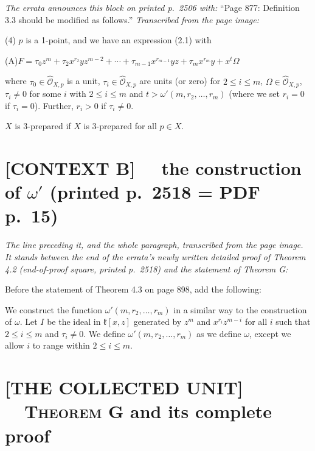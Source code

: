 \documentclass[11pt]{article}
\newcommand{\fk}{\mathfrak{k}}                 %
\newcommand{\OH}{\widehat{\mathcal{O}}}        %
\begin{document}
\emph{The errata announces this block on printed p.\ 2506 with:} ``Page 877: Definition
3.3 should be modified as follows.'' \emph{Transcribed from the page image:}

\medskip
(4) $p$ is a 1-point, and we have an expression (2.1) with

(A)\quad $F = \tau_0 z^m + \tau_2 x^{r_2} y z^{m-2} + \cdots + \tau_{m-1} x^{r_{m-1}} y z + \tau_m x^{r_m} y + x^t \Omega$

\smallskip
where $\tau_0 \in \OH_{X,p}$ is a unit, $\tau_i \in \OH_{X,p}$ are units (or zero) for
$2 \leqslant i \leqslant m$, $\Omega \in \OH_{X,p}$, $\tau_i \neq 0$ for some $i$ with
$2 \leqslant i \leqslant m$ and $t > \omega'(m, r_2, \dots, r_m)$ (where we set $r_i = 0$
if $\tau_i = 0$). Further, $r_i > 0$ if $\tau_i \neq 0$.

\medskip
$X$ is 3-prepared if $X$ is 3-prepared for all $p \in X$.

\section*{[CONTEXT B] \ \ the construction of $\omega'$ \quad (printed p.\ 2518 = PDF p.\ 15)}

\emph{The line preceding it, and the whole paragraph, transcribed from the page image. It
stands between the end of the errata's newly written detailed proof of Theorem 4.2
(end-of-proof square, printed p.\ 2518) and the statement of Theorem G:}

\medskip
Before the statement of Theorem 4.3 on page 898, add the following:

We construct the function $\omega'(m, r_2, \dots, r_m)$ in a similar way to the
construction of $\omega$. Let $I$ be the ideal in $\fk[x, z]$ generated by $z^m$ and
$x^{r_i} z^{m-i}$ for all $i$ such that $2 \leqslant i \leqslant m$ and $\tau_i \neq 0$.
We define $\omega'(m, r_2, \dots, r_m)$ as we define $\omega$, except we allow $i$ to
range within $2 \leqslant i \leqslant m$.

\section*{[THE COLLECTED UNIT] \ \ \textsc{Theorem G} and its complete proof}
\end{document}

